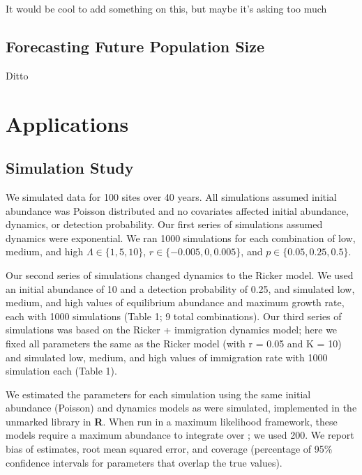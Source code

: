 \documentclass[12pt]{article}
\begin{document}
It would be cool to add something on this, but maybe it's asking too much

\subsection{Forecasting Future Population Size}

Ditto


\section{Applications}
\label{sec:app}

\subsection{Simulation Study}


We simulated data for 100 sites over 40 years.  All
simulations assumed initial abundance was Poisson distributed
and no covariates affected initial abundance, dynamics, or
detection probability.  Our first series of simulations
assumed dynamics were exponential.  We ran 1000 simulations for
each combination of low, medium, and high $\Lambda \in \{1,5,10\}$, $r
\in \{-0.005, 0, 0.005\}$, and
$p \in \{0.05, 0.25, 0.5\}$. %

Our second series of simulations changed dynamics to the Ricker model.
We used an initial abundance of 10 and a detection probability of 0.25,
and simulated low, medium, and high values of equilibrium abundance
and maximum growth rate, each with 1000 simulations (Table 1;
9 total combinations).  Our third series of simulations was based on the
Ricker + immigration dynamics model; here we fixed all parameters the
same as the Ricker model (with r = 0.05 and K = 10) and simulated
low, medium, and high values of immigration rate with 1000 simulation
each (Table 1).

We estimated the parameters for each simulation using the same
initial abundance (Poisson) and dynamics models as were
simulated, implemented in the unmarked library in \textbf{R}.  When run
in a maximum likelihood framework, these models require a
maximum abundance to integrate over
\citep{royle:2004biom,dail_madsen:2011};
we used 200.  We report bias of estimates, root
mean squared error, and coverage (percentage of 95\% confidence
intervals for parameters that
overlap the true values).

\end{document}
